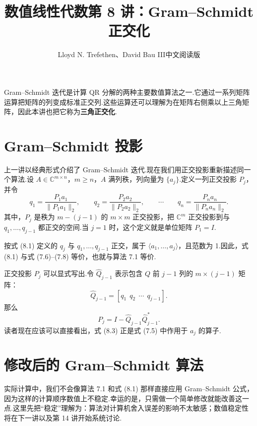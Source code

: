 \documentclass[UTF8,fontset=none,12pt]{ctexart}
\title{数值线性代数\quad 第 8 讲：Gram--Schmidt 正交化}
\author{Lloyd N. Trefethen、David Bau III\quad 中文阅读版}
\date{}
\newcommand{\C}{\mathbb{C}}
\theoremstyle{definition}
\begin{document}
\maketitle
\pagestyle{plain}

Gram--Schmidt 迭代是计算 QR 分解的两种主要数值算法之一.它通过一系列矩阵运算把矩阵的列变成标准正交列.这些运算还可以理解为在矩阵右侧乘以上三角矩阵，因此本讲也把它称为\textbf{三角正交化}.

\section*{Gram--Schmidt 投影}

上一讲以经典形式介绍了 Gram--Schmidt 迭代.现在我们用正交投影重新描述同一个算法.设 $A\in\C^{m\times n}$，$m\ge n$，$A$ 满列秩，列向量为 $\{a_j\}$.定义一列正交投影 $P_j$，并令
\begin{equation}
    q_1=\frac{P_1a_1}{\|P_1a_1\|_2},\qquad
    q_2=\frac{P_2a_2}{\|P_2a_2\|_2},\qquad\cdots\qquad
    q_n=\frac{P_na_n}{\|P_na_n\|_2}.
    \tag{8.1}
\end{equation}
其中，$P_j$ 是秩为 $m-(j-1)$ 的 $m\times m$ 正交投影，把 $\C^m$ 正交投影到与 $q_1,\ldots,q_{j-1}$ 都正交的空间.当 $j=1$ 时，这个定义就是单位矩阵 $P_1=I$.

按式 (8.1) 定义的 $q_j$ 与 $q_1,\ldots,q_{j-1}$ 正交，属于 $\langle a_1,\ldots,a_j\rangle$，且范数为 1.因此，式 (8.1) 与式 (7.6)--(7.8) 等价，也就与算法 7.1 等价.

正交投影 $P_j$ 可以显式写出.令 $\widehat Q_{j-1}$ 表示包含 $Q$ 前 $j-1$ 列的 $m\times(j-1)$ 矩阵：
\begin{equation}
    \widehat Q_{j-1}=[q_1\ \ q_2\ \ \cdots\ \ q_{j-1}].
    \tag{8.2}
\end{equation}
那么
\begin{equation}
    P_j=I-\widehat Q_{j-1}\widehat Q_{j-1}^*.
    \tag{8.3}
\end{equation}
读者现在应该可以直接看出，式 (8.3) 正是式 (7.5) 中作用于 $a_j$ 的算子.

\section*{修改后的 Gram--Schmidt 算法}

实际计算中，我们不会像算法 7.1 和式 (8.1) 那样直接应用 Gram--Schmidt 公式，因为这样的计算顺序数值上不稳定.幸运的是，只需做一个简单修改就能改善这一点.这里先把“稳定”理解为：算法对计算机舍入误差的影响不太敏感；数值稳定性将在下一讲以及第 14 讲开始系统讨论.
\end{document}
